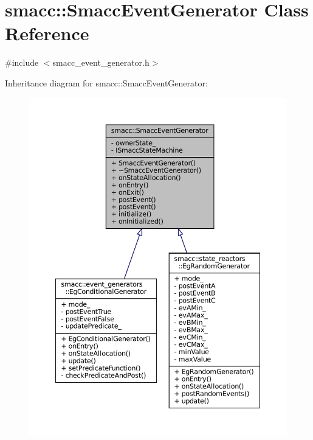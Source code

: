 \hypertarget{classsmacc_1_1SmaccEventGenerator}{}\section{smacc\+:\+:Smacc\+Event\+Generator Class Reference}
\label{classsmacc_1_1SmaccEventGenerator}


{\ttfamily \#include $<$smacc\+\_\+event\+\_\+generator.\+h$>$}



Inheritance diagram for smacc\+:\+:Smacc\+Event\+Generator\+:
\nopagebreak
\begin{figure}[H]
\begin{center}
\leavevmode
\includegraphics[width=350pt]{classsmacc_1_1SmaccEventGenerator__inherit__graph}
\end{center}
\end{figure}


